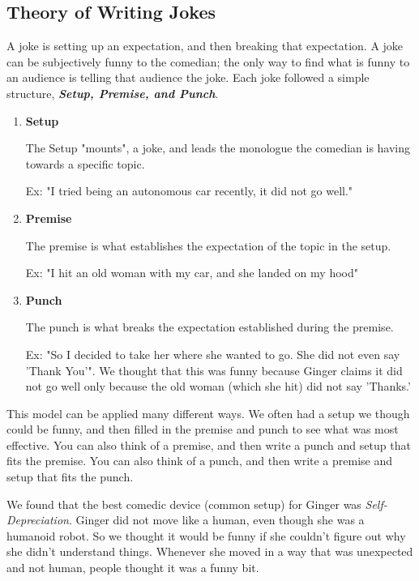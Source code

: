 \documentclass[onecolumn, draftclsnofoot,10pt, compsoc]{IEEEtran}
\begin{document}
\subsection{Theory of Writing Jokes}
A joke is setting up an expectation, and then breaking that expectation.
A joke can be subjectively funny to the comedian; the only way to find what is funny to an audience is telling that audience the joke.
Each joke followed a simple structure, \textit{\textbf{Setup, Premise, and Punch}}.

    \begin{enumerate}
        \item{\textbf{Setup}}

            The Setup "mounts", a joke, and leads the monologue the comedian is having towards a specific topic.


            Ex: "I tried being an autonomous car recently, it did not go well."
        \item{\textbf{Premise}}

            The premise is what establishes the expectation of the topic in the setup.


            Ex: "I hit an old woman with my car, and she landed on my hood"
        \item{\textbf{Punch}}

            The punch is what breaks the expectation established during the premise.


            Ex: "So I decided to take her where she wanted to go. She did not even say 'Thank You'".
            We thought that this was funny because Ginger claims it did not go well only because the old woman (which she hit) did not say 'Thanks.'
    \end{enumerate}

This model can be applied many different ways. 
We often had a setup we though could be funny, and then filled in the premise and punch to see what was most effective.
You can also think of a premise, and then write a punch and setup that fits the premise.
You can also think of a punch, and then write a premise and setup that fits the punch.

We found that the best comedic device (common setup) for Ginger was \textit{Self-Depreciation}. 
Ginger did not move like a human, even though she was a humanoid robot.
So we thought it would be funny if she couldn't figure out why she didn't understand things.
Whenever she moved in a way that was unexpected and not human, people thought it was a funny bit.
\end{document}
